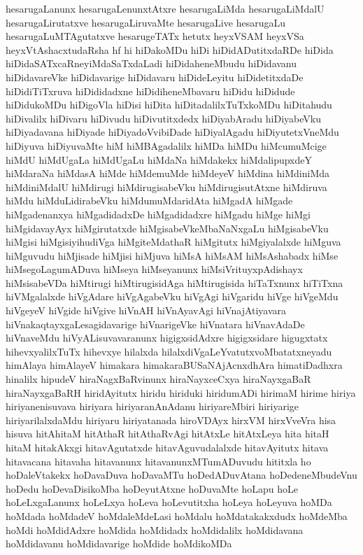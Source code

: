 {hesarugaLanunx
hesarugaLenunxtAtxre
hesarugaLiMda
hesarugaLiMdalU
hesarugaLirutatxve
hesarugaLiruvaMte
hesarugaLive
hesarugaLu
hesarugaLuMTAgutatxve
hesarugeTATx
hetutx
heyxVSAM
heyxVSa
heyxVtAshacxtudaRsha
hf
hi
hiDakoMDu
hiDi
hiDidADutitxdaRDe
hiDida
hiDidaSATxcaRneyiMdaSaTxdaLadi
hiDidaheneMbudu
hiDidavanu
hiDidavareVke
hiDidavarige
hiDidavaru
hiDideLeyitu
hiDidetitxdaDe
hiDidiTiTxruva
hiDididadxne
hiDidiheneMbavaru
hiDidu
hiDidude
hiDidukoMDu
hiDigoVla
hiDisi
hiDita
hiDitadalilxTuTxkoMDu
hiDitahudu
hiDivalilx
hiDivaru
hiDivudu
hiDivutitxdedx
hiDiyabAradu
hiDiyabeVku
hiDiyadavana
hiDiyade
hiDiyadoVvibiDade
hiDiyalAgadu
hiDiyutetxVneMdu
hiDiyuva
hiDiyuvaMte
hiM
hiMBAgadalilx
hiMDa
hiMDu
hiMcumuMcige
hiMdU
hiMdUgaLa
hiMdUgaLu
hiMdaNa
hiMdakekx
hiMdalipupxdeY
hiMdaraNa
hiMdasA
hiMde
hiMdemuMde
hiMdeyeV
hiMdina
hiMdiniMda
hiMdiniMdalU
hiMdirugi
hiMdirugisabeVku
hiMdirugisutAtxne
hiMdiruva
hiMdu
hiMduLidirabeVku
hiMdumuMdaridAta
hiMgadA
hiMgade
hiMgadenanxya
hiMgadidadxDe
hiMgadidadxre
hiMgadu
hiMge
hiMgi
hiMgidavayAyx
hiMgirutatxde
hiMgisabeVkeMbaNaNxgaLu
hiMgisabeVku
hiMgisi
hiMgisiyihudiVga
hiMgiteMdathaR
hiMgitutx
hiMgiyalalxde
hiMguva
hiMguvudu
hiMjisade
hiMjisi
hiMjuva
hiMsA
hiMsAM
hiMsAshabadx
hiMse
hiMsegoLagumADuva
hiMseya
hiMseyanunx
hiMsiVrituyxpAdishayx
hiMsisabeVDa
hiMtirugi
hiMtirugisidAga
hiMtirugisida
hiTaTxnunx
hiTiTxna
hiVMgalalxde
hiVgAdare
hiVgAgabeVku
hiVgAgi
hiVgaridu
hiVge
hiVgeMdu
hiVgeyeV
hiVgide
hiVgive
hiVnAH
hiVnAyavAgi
hiVnajAtiyavara
hiVnakaqtayxgaLesagidavarige
hiVnarigeVke
hiVnatara
hiVnavAdaDe
hiVnaveMdu
hiVyALisuvavaranunx
higigxsidAdxre
higigxsidare
higugxtatx
hihevxyalilxTuTx
hihevxye
hilalxda
hilalxdiVgaLeYvatutxvoMbatatxneyadu
himAlaya
himAlayeV
himakara
himakaraBUSaNAjAcnxdhAra
himatiDadhxra
hinalilx
hipudeV
hiraNagxBaRvinunx
hiraNayxceCxya
hiraNayxgaBaR
hiraNayxgaBaRH
hiridAyitutx
hiridu
hiriduki
hiridumADi
hirimaM
hirime
hiriya
hiriyanenisuvava
hiriyara
hiriyaranAnAdanu
hiriyareMbiri
hiriyarige
hiriyarilalxdaMdu
hiriyaru
hiriyatanada
hiroVDAyx
hirxVM
hirxVveVra
hisa
hisuva
hitAhitaM
hitAthaR
hitAthaRvAgi
hitAtxLe
hitAtxLeya
hita
hitaH
hitaM
hitakAkxgi
hitavAgutatxde
hitavAguvudalalxde
hitavAyitutx
hitava
hitavacana
hitavaha
hitavanunx
hitavanunxMTumADuvudu
hititxla
ho
hoDaleVtakekx
hoDavaDuva
hoDavaMTu
hoDedADuvAtana
hoDedeneMbudeVnu
hoDedu
hoDevaDisikoMba
hoDeyutAtxne
hoDuvaMte
hoLapu
hoLe
hoLeLxgaLanunx
hoLeLxya
hoLeva
hoLevutitxha
hoLeya
hoLeyuva
hoMDa
hoMdada
hoMdadeV
hoMdaleMdeLasi
hoMdalu
hoMdatakakxdudx
hoMdeMba
hoMdi
hoMdidAdxre
hoMdida
hoMdidadx
hoMdidalilx
hoMdidavana
hoMdidavanu
hoMdidavarige
hoMdide
hoMdikoMDa
}
